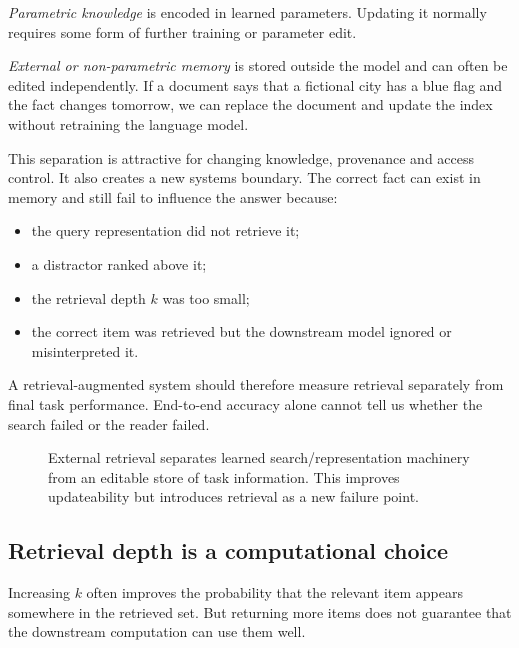 \emph{Parametric knowledge} is encoded in learned parameters. Updating it normally requires some form of further training or parameter edit.

\emph{External or non-parametric memory} is stored outside the model and can often be edited independently. If a document says that a fictional city has a blue flag and the fact changes tomorrow, we can replace the document and update the index without retraining the language model.

This separation is attractive for changing knowledge, provenance and access control. It also creates a new systems boundary. The correct fact can exist in memory and still fail to influence the answer because:
\begin{itemize}[leftmargin=*]
  \item the query representation did not retrieve it;
  \item a distractor ranked above it;
  \item the retrieval depth \(k\) was too small;
  \item the correct item was retrieved but the downstream model ignored or misinterpreted it.
\end{itemize}

A retrieval-augmented system should therefore measure retrieval separately from final task performance. End-to-end accuracy alone cannot tell us whether the search failed or the reader failed.

\begin{figure}[ht]
  \caption{External retrieval separates learned search/representation machinery from an editable store of task information. This improves updateability but introduces retrieval as a new failure point.}
  \label{fig:week11-rag}
\end{figure}

\subsection{Retrieval depth is a computational choice}

Increasing \(k\) often improves the probability that the relevant item appears somewhere in the retrieved set. But returning more items does not guarantee that the downstream computation can use them well.

